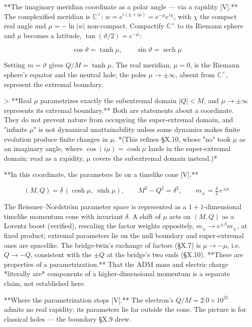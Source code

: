 **The imaginary meridian coordinate as a polar angle — via a rapidity [V].** The complexified meridian is $\mathbb{C}^\times$: $w = e^{i(\chi+i\mu)} = e^{-\mu}e^{i\chi}$, with $\chi$ the compact real angle and $\mu = -\ln|w|$ non-compact. Compactify $\mathbb{C}^\times$ to its Riemann sphere and $\mu$ becomes a latitude, $\tan(\vartheta/2) = e^{-\mu}$:

$$\cos\vartheta = \tanh\mu,\qquad\sin\vartheta = \operatorname{sech}\mu$$

Setting $m = \vartheta$ gives $Q/M = \tanh\mu$. The real meridian, $\mu = 0$, is the Riemann sphere's equator and the neutral hole; the poles $\mu\to\pm\infty$, absent from $\mathbb{C}^\times$, represent the extremal boundary.

> **Real $\mu$ parametrizes exactly the subextremal domain $|Q|<M$, and $\mu\to\pm\infty$ represents its extremal boundary.** Both are statements about a coordinate. They do not prevent nature from occupying the super-extremal domain, and "infinite $\mu$" is not dynamical unattainability unless some dynamics makes finite evolution produce finite changes in $\mu$. *(This refines §X.10, whose "no" took $\mu$ as an imaginary angle, where $\cos(i\mu) = \cosh\mu$ lands in the super-extremal domain; read as a rapidity, $\mu$ covers the subextremal domain instead.)*

**In this coordinate, the parameters lie on a timelike cone [V].**

$$(M,Q) = \delta\,(\cosh\mu,\ \sinh\mu),\qquad M^2-Q^2 = \delta^2,\qquad m_\pm = \tfrac\delta2\,e^{\pm\mu}$$

The Reissner–Nordström parameter space is represented as a $1+1$-dimensional timelike momentum cone with invariant $\delta$. A shift of $\mu$ acts on $(M,Q)$ as a Lorentz boost (verified), rescaling the factor weights oppositely, $m_\pm\to e^{\pm\beta}m_\pm$, at fixed product; extremal parameters lie on the null boundary and super-extremal ones are spacelike. The bridge-twin's exchange of factors (§X.7) is $\mu\to-\mu$, i.e. $Q\to-Q$, consistent with the $\pm Q$ at the bridge's two ends (§X.10). **These are properties of a parametrization.** That the ADM mass and electric charge *literally are* components of a higher-dimensional momentum is a separate claim, not established here.

**Where the parametrization stops [V].** The electron's $Q/M = 2.0\times10^{21}$ admits no real rapidity; its parameters lie far outside the cone. The picture is for classical holes — the boundary §X.9 drew.

